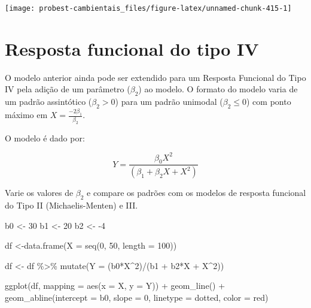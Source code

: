 \documentclass[
]{book}
\newenvironment{Shaded}{\begin{snugshade}}{\end{snugshade}}
\newcommand{\AttributeTok}[1]{\textcolor[rgb]{0.77,0.63,0.00}{#1}}
\newcommand{\DecValTok}[1]{\textcolor[rgb]{0.00,0.00,0.81}{#1}}
\newcommand{\FunctionTok}[1]{\textcolor[rgb]{0.00,0.00,0.00}{#1}}
\newcommand{\NormalTok}[1]{#1}
\newcommand{\OtherTok}[1]{\textcolor[rgb]{0.56,0.35,0.01}{#1}}
\newcommand{\SpecialCharTok}[1]{\textcolor[rgb]{0.00,0.00,0.00}{#1}}
\newcommand{\StringTok}[1]{\textcolor[rgb]{0.31,0.60,0.02}{#1}}
\begin{document}
\begin{center}\texttt{[image: probest-cambientais\_files/figure-latex/unnamed-chunk-415-1]} \end{center}

\hypertarget{resposta-funcional-do-tipo-iv}{%
\section{Resposta funcional do tipo IV}\label{resposta-funcional-do-tipo-iv}}

O modelo anterior ainda pode ser extendido para um Resposta Funcional do Tipo IV pela adição de um parâmetro (\(\beta_2\)) ao modelo. O formato do modelo varia de um padrão assintótico (\(\beta_2 > 0\)) para um padrão unimodal (\(\beta_2 \le 0\)) com ponto máximo em \(X = \frac{-2\beta_1}{\beta_2}\).

O modelo é dado por:

\[Y = \frac{\beta_0 X^2}{(\beta_1 + \beta_2 X + X^2)}\]

Varie os valores de \(\beta_2\) e compare os padrões com os modelos de resposta funcional do Tipo II (Michaelis-Menten) e III.

\begin{Shaded}
\begin{Highlighting}[]
\NormalTok{b0 }\OtherTok{\textless{}{-}} \DecValTok{30}
\NormalTok{b1 }\OtherTok{\textless{}{-}} \DecValTok{20}
\NormalTok{b2 }\OtherTok{\textless{}{-}} \SpecialCharTok{{-}}\DecValTok{4}

\NormalTok{df }\OtherTok{\textless{}{-}}\FunctionTok{data.frame}\NormalTok{(}\AttributeTok{X =} \FunctionTok{seq}\NormalTok{(}\DecValTok{0}\NormalTok{, }\DecValTok{50}\NormalTok{, }\AttributeTok{length =} \DecValTok{100}\NormalTok{))}

\NormalTok{df }\OtherTok{\textless{}{-}}\NormalTok{ df }\SpecialCharTok{\%\textgreater{}\%} \FunctionTok{mutate}\NormalTok{(}\AttributeTok{Y =}\NormalTok{ (b0}\SpecialCharTok{*}\NormalTok{X}\SpecialCharTok{\^{}}\DecValTok{2}\NormalTok{)}\SpecialCharTok{/}\NormalTok{(b1 }\SpecialCharTok{+}\NormalTok{ b2}\SpecialCharTok{*}\NormalTok{X }\SpecialCharTok{+}\NormalTok{ X}\SpecialCharTok{\^{}}\DecValTok{2}\NormalTok{))}

\FunctionTok{ggplot}\NormalTok{(df, }\AttributeTok{mapping =} \FunctionTok{aes}\NormalTok{(}\AttributeTok{x =}\NormalTok{ X, }\AttributeTok{y =}\NormalTok{ Y)) }\SpecialCharTok{+}
  \FunctionTok{geom\_line}\NormalTok{() }\SpecialCharTok{+}
  \FunctionTok{geom\_abline}\NormalTok{(}\AttributeTok{intercept =}\NormalTok{ b0, }\AttributeTok{slope =} \DecValTok{0}\NormalTok{, }\AttributeTok{linetype =} \StringTok{\textquotesingle{}dotted\textquotesingle{}}\NormalTok{, }\AttributeTok{color =} \StringTok{\textquotesingle{}red\textquotesingle{}}\NormalTok{)}
\end{Highlighting}
\end{Shaded}
\end{document}
